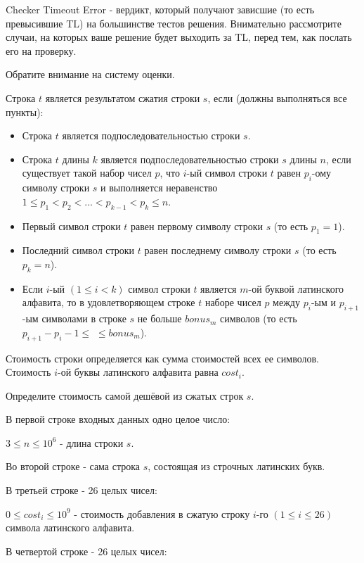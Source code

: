 
Checker Timeout Error - вердикт, который получают зависшие (то есть превысившие TL) на большинстве тестов решения. 
Внимательно рассмотрите случаи, на которых ваше решение будет выходить за TL, перед тем, как послать его на проверку.

Обратите внимание на систему оценки.

Строка $t$ является результатом сжатия строки $s$, если (должны выполняться все пункты):
\begin{itemize}
    \item Строка $t$ является подпоследовательностью строки $s$.
    \item Строка $t$ длины $k$ является подпоследовательностью строки $s$ длины $n$, если существует такой набор чисел $p$, что $i$-ый символ строки $t$ равен 
    $p_{i}$-ому символу строки $s$ и выполняется неравенство $1 \leq p_{1} < p_{2} < ... < p_{k-1} < p_{k} \leq n$.
    \item Первый символ строки $t$ равен первому символу строки $s$ (то есть $p_{1} = 1$).
    \item Последний символ строки $t$ равен последнему символу строки $s$ (то есть \linebreak $p_{k} = n$).
    \item Если $i$-ый $(1 \leq i < k)$ символ строки $t$ является $m$-ой буквой латинского алфавита, то в удовлетворяющем строке $t$ наборе чисел $p$ между $p_i$-ым и 
    $p_{i+1}$-ым символами в строке $s$ не больше $bonus_m$ символов (то есть $p_{i+1}-p_{i} - 1 \leq$ \linebreak $\leq bonus_m$).   
\end{itemize}

Стоимость строки определяется как сумма стоимостей всех ее символов. Стоимость $i$-ой буквы латинского алфавита равна $cost_{i}$.

Определите стоимость самой дешёвой из сжатых строк $s$.

В первой строке входных данных одно целое число: 

$3 \le n \le 10^{6}$ - длина строки $s$.

Во второй строке - сама строка $s$, состоящая из строчных латинских букв.

В третьей строке - 26 целых чисел:

$0 \le cost_{i} \le 10^{9}$ - стоимость добавления в сжатую строку $i$-го $(1 \le i \le 26)$ символа латинского алфавита.

В четвертой строке - 26 целых чисел:

